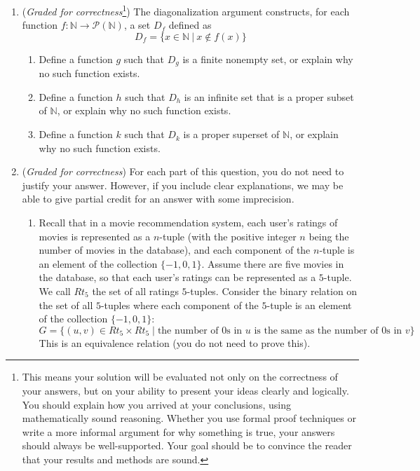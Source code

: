 \documentclass[12pt, oneside]{article}
\begin{document}
\begin{enumerate}
    \item ({\it Graded for correctness}\footnote{This means your solution will be
    evaluated not only on the correctness of your answers, but on your ability to 
    present your ideas clearly and logically. You should explain how you arrived at 
    your conclusions, using 
    mathematically sound reasoning. Whether you use formal proof techniques or 
    write a more informal argument for why 
    something is true, your answers should always be well-supported. Your goal 
    should be to convince the reader that 
    your results and methods are sound.})
    The diagonalization argument constructs, for each function 
    $f: \mathbb{N} \to \mathcal{P}(\mathbb{N})$, a set $D_f$ defined as
    \[
    D_f = \{ x \in \mathbb{N} ~|~ x \notin f(x) \}
    \]
    \begin{enumerate}
        \item Define a function $g$ such that $D_g$ is a finite nonempty set, 
        or explain why no such function exists.
        \item Define a function $h$ such that $D_h$ is an infinite set that is a proper subset of 
        $\mathbb{N}$, or explain why no such function exists.
        \item Define a function $k$ such that $D_k$ is a proper superset
        of $\mathbb{N}$, or explain why no such function exists.
    \end{enumerate}    
    
    \item ({\it Graded for correctness}) For each part of this question, you do not need to justify your answer.  
    However, if you include clear explanations, 
    we may be able to give partial credit for an answer with some imprecision.
        
    \begin{enumerate}
    \item Recall that 
    in a movie recommendation system, each 
    user's ratings of movies is represented as a $n$-tuple (with the positive integer $n$ 
    being the number of movies in the database), and each component of 
    the $n$-tuple is an element of the collection $\{-1,0,1\}$. Assume there are five movies in the database, 
    so that each user's ratings
    can be represented as a $5$-tuple. We call $Rt_5$ the set of all ratings $5$-tuples.
    Consider the binary relation on the  set of all 
    $5$-tuples where each  component of the $5$-tuple is an element of the collection $\{-1,0,1\}$:
    \[
        G = \{ (u,v) \in Rt_5 \times Rt_5 \mid \text{the number of $0$s in $u$ is the same as the number of $0$s in $v$} \}
    \]
    This is an equivalence relation (you do not need to prove this).


\end{enumerate}
\end{enumerate}
\end{document}
